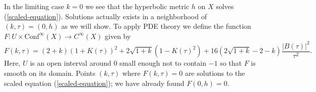 In the limiting case $k=0$ we see that the hyperbolic metric $h$ on $X$ solves (\ref{scaled-equation}). 
Solutions actually exists in a neighborhood of $(k,\tau) = (0,h)$ as we will show.
To apply PDE theory we define the function $F : U \times \mathrm{Conf}^\infty(X) \to C^\infty(X)$ given by 
\[
F(k,\tau) = (2+k)(1+K(\tau))^2 + 2\sqrt{1+k}\left(1-K(\tau)^2 \right) +16\left(2\sqrt{1+k} - 2 - k  \right)\frac{|B(\tau)|^2}{\tau^2}.
\]
Here, $U$ is an open interval around $0$ small enough not to contain $-1$ so that $F$ is smooth on its domain. 
Points $(k,\tau)$ where $F(k,\tau) = 0$ are solutions to the scaled equation (\ref{scaled-equation}); we have already found $F(0,h) = 0$.